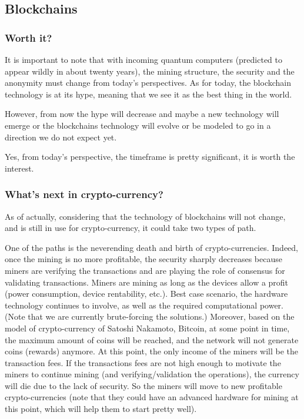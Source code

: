 
\subsection{Blockchains}
\subsubsection{Worth it?}
It is important to note that with incoming quantum computers (predicted to appear wildly in about twenty years), the mining structure, the security and the anonymity must change from today's perspectives. 
As for today, the blockchain technology is at its hype, meaning that we see it as the best thing in the world.

However, from now the hype will decrease and maybe a new technology will emerge or the blockchains technology will evolve or be modeled to go in a direction we do not expect yet.

Yes, from today's perspective, the timeframe is pretty significant, it is worth the interest.

\subsubsection{What's next in crypto-currency?}

As of actually, considering that the technology of blockchains will not change, and is still in use for crypto-currency, it could take two types of path.

One of the paths is the neverending death and birth of crypto-currencies. Indeed, once the mining is no more profitable, the security sharply decreases because miners are verifying the transactions and are playing the role of consensus for validating transactions. Miners are mining as long as the devices allow a profit (power consumption, device rentability, etc.). Best case scenario, the hardware technology continues to involve, as well as the required computational power. (Note that we are currently brute-forcing the solutions.) Moreover, based on the model of crypto-currency of Satoshi Nakamoto, Bitcoin, at some point in time, the maximum amount of coins will be reached, and the network will not generate coins (rewards) anymore. At this point, the only income of the miners will be the transaction fees. If the transactions fees are not high enough to motivate the miners to continue mining (and verifying/validation the operations), the currency will die due to the lack of security. So the miners will move to new profitable crypto-currencies (note that they could have an advanced hardware for mining at this point, which will help them to start pretty well).

